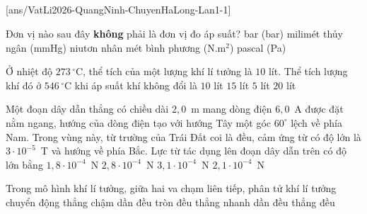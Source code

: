 	\noindent
	\subsection*{}
	\setcounter{ex}{0}
	[ans/VatLi2026-QuangNinh-ChuyenHaLong-Lan1-1]

	\begin{ex}%
		Đơn vị nào sau đây \textbf{không} phải là đơn vị đo áp suất?
		\choice
		{bar (bar)}
		{milimét thủy ngân (mmHg)}
		{\True niutơn nhân mét bình phương (N.m$^2$)}
		{pascal (Pa)}
	\end{ex}

	\begin{ex}%
		Ở nhiệt độ $273\,^\circ\text{C}$, thể tích của một lượng khí lí tưởng là $10$ lít. Thể tích lượng khí đó ở $546\,^\circ\text{C}$ khi áp suất khí không đổi là
		\choice
		{$10$ lít}
		{\True $15$ lít}
		{$5$ lít}
		{$20$ lít}
	\end{ex}

	\begin{ex}%
		Một đoạn dây dẫn thẳng có chiều dài $2{,}0$~m mang dòng điện $6{,}0$~A được đặt nằm ngang, hướng của dòng điện tạo với hướng Tây một góc $60^\circ$ lệch về phía Nam. Trong vùng này, từ trường của Trái Đất coi là đều, cảm ứng từ có độ lớn là $3\cdot 10^{-5}$~T và hướng về phía Bắc. Lực từ tác dụng lên đoạn dây dẫn trên có độ lớn bằng
		\choice
		{\True $1{,}8\cdot 10^{-4}$~N}
		{$2{,}8\cdot 10^{-4}$~N}
		{$3{,}1\cdot 10^{-4}$~N}
		{$2{,}1\cdot 10^{-4}$~N}
	\end{ex}

	\begin{ex}%
		Trong mô hình khí lí tưởng, giữa hai va chạm liên tiếp, phân tử khí lí tưởng chuyển động
		\choice
		{thẳng chậm dần đều}
		{tròn đều}
		{thẳng nhanh dần đều}
		{\True thẳng đều}
	\end{ex}

